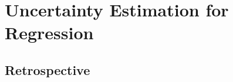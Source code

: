 \chapter{Uncertainty Estimation for Regression}
\label{chap:regression}







\section*{Retrospective}
%